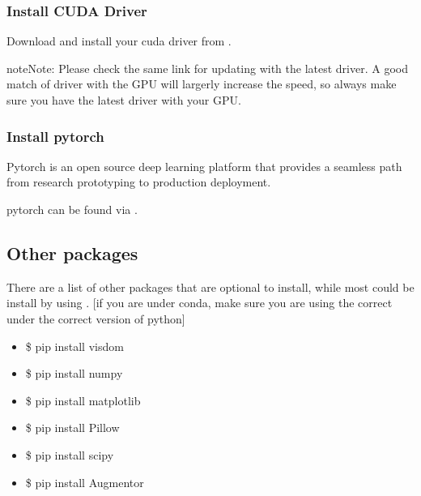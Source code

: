 \documentclass[letterpaper,10pt,english]{sphinxmanual}
\begin{document}
\subsubsection{Install CUDA Driver}
\label{\detokenize{usage/installation:install-cuda-driver}}
Download and install your cuda driver from .

\begin{sphinxadmonition}{note}{Note:}
Please check the same link for updating with the latest driver. A good match of driver with the GPU will largerly increase the speed, so always make sure you have the latest driver with your GPU.
\end{sphinxadmonition}


\subsubsection{Install pytorch}
\label{\detokenize{usage/installation:install-pytorch}}
Pytorch is an open source deep learning platform that provides a seamless path from research prototyping to production deployment.

pytorch can be found via .


\subsection{Other packages}
\label{\detokenize{usage/installation:other-packages}}
There are a list of other packages that are optional to install, while most could be install by using . {[}if you are under conda, make sure you are using the correct  under the correct version of python{]}
\begin{itemize}
\item {} 
\$ pip install visdom

\item {} 
\$ pip install numpy

\item {} 
\$ pip install matplotlib

\item {} 
\$ pip install Pillow

\item {} 
\$ pip install scipy

\item {} 
\$ pip install Augmentor

\end{itemize}
\end{document}
